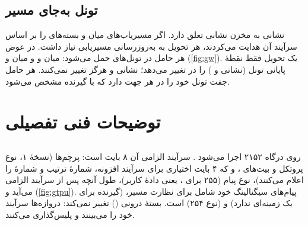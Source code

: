 \documentclass[11pt,a4paper]{article}
\begin{document}
\subsection{تونل به‌جای مسیر}
نشانی   به مخزن نشانی  تعلق دارد. اگر مسیریاب‌های میان  و  بسته‌های  را
بر اساس سرآیند  آن هدایت می‌کردند، هر تحویل به به‌روزرسانی مسیریابی نیاز داشت. در عوض هر حامل در تونل‌های
 حمل می‌شود:  میان  و  و  میان  و  (\cref{fig:gw}). یک تحویل
فقط نقطهٔ پایانی تونل (نشانی و ) را در  تغییر می‌دهد؛ نشانی  و  هرگز تغییر نمی‌کنند.
هر حامل جفت تونل خود را در هر جهت دارد که با  گیرنده مشخص می‌شود.

\begin{acnfigure}
  \caption{ و  روی مسیر صفحهٔ کاربر با کارکردهای اصلی آن‌ها.}
  \label{fig:gw}
\end{acnfigure}

\section{توضیحات فنی تفصیلی}

\subsection{}
 روی درگاه  ۲۱۵۲ اجرا می‌شود \cite{ts29281}. سرآیند الزامی آن ۸ بایت است: پرچم‌ها (نسخهٔ ۱، نوع پروتکل
و بیت‌های ،  و  که ۴ بایت اختیاری برای سرآیند افزونه، شمارهٔ ترتیب و شمارهٔ  را اعلام می‌کنند)،
نوع پیام (۲۵۵ برای ، یعنی دادهٔ کاربر)، طول آنچه پس از سرآیند الزامی می‌آید و  (\cref{fig:gtpu}).
پیام‌های سیگنالینگ خود  شامل  برای نظارت مسیر،  (گیرنده برای یک
 زمینه‌ای ندارد) و  (نوع ۲۵۴) است. بستهٔ درونی () تغییر نمی‌کند: دروازه‌ها سرآیند
 خود  را می‌بینند و پلیس‌گذاری می‌کنند.

\begin{acnfigure}
  \caption{کپسوله‌سازی  یک بستهٔ کاربر و سرآیند الزامی .}
  \label{fig:gtpu}
\end{acnfigure}
\end{document}
